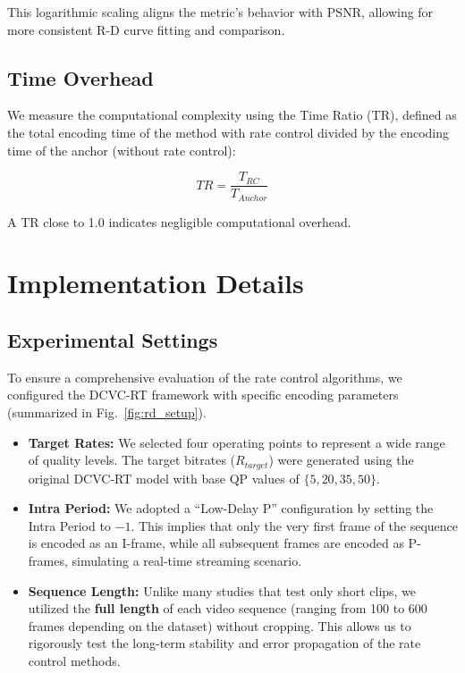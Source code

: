 This logarithmic scaling aligns the metric's behavior with PSNR, allowing for more consistent R-D curve fitting and comparison.

\subsection{Time Overhead}
We measure the computational complexity using the Time Ratio (TR), defined as the total encoding time of the method with rate control divided by the encoding time of the anchor (without rate control):

\begin{equation}
    TR = \frac{T_{RC}}{T_{Anchor}}
\end{equation}

A TR close to 1.0 indicates negligible computational overhead.

\section{Implementation Details}

\subsection{Experimental Settings}

To ensure a comprehensive evaluation of the rate control algorithms, we configured the DCVC-RT framework with specific encoding parameters (summarized in Fig.~\ref{fig:rd_setup}). 

\begin{itemize}
    \item \textbf{Target Rates:} We selected four operating points to represent a wide range of quality levels. The target bitrates ($R_{target}$) were generated using the original DCVC-RT model with base QP values of $\{5, 20, 35, 50\}$.
    \item \textbf{Intra Period:} We adopted a ``Low-Delay P'' configuration by setting the Intra Period to $-1$. This implies that only the very first frame of the sequence is encoded as an I-frame, while all subsequent frames are encoded as P-frames, simulating a real-time streaming scenario.
    \item \textbf{Sequence Length:} Unlike many studies that test only short clips, we utilized the \textbf{full length} of each video sequence (ranging from 100 to 600 frames depending on the dataset) without cropping. This allows us to rigorously test the long-term stability and error propagation of the rate control methods.
\end{itemize}

